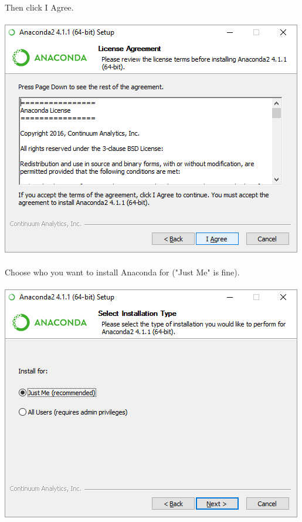 \documentclass[]{article}
\begin{document}
\paragraph{}
Then click I Agree.
\paragraph{}
\begin{centering}
    \centerline{\includegraphics[scale=0.7]{Screenshot_6.png}}
\end{centering}

\paragraph{}
Choose who you want to install Anaconda for ("Just Me" is fine).
\paragraph{}
\begin{centering}
    \centerline{\includegraphics[scale=0.7]{Screenshot_7.png}}
\end{centering}
\end{document}
